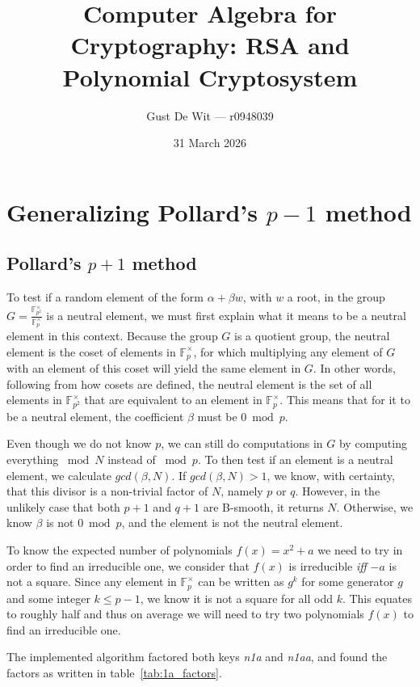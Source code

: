 \documentclass{article}
\title{Computer Algebra for Cryptography: RSA and Polynomial Cryptosystem}
\author{Gust De Wit --- r0948039 }
\date{31 March 2026}
\begin{document}
\maketitle

\section{Generalizing Pollard's $p-1$ method}
\subsection{Pollard's $p+1$ method}
To test if a random element of the form $\alpha + \beta w$, with $w$ a root, in the group $G = \frac{\mathbb{F}_{p^2}^\times}{\mathbb{F}_p^\times}$ is a neutral element, we must first explain what it means to be a neutral element in this context. Because the group $G$ is a quotient group, the neutral element is the coset of elements in $\mathbb{F}_{p}^\times$, for which multiplying any element of $G$ with an element of this coset will yield the same element in $G$. In other words, following from how cosets are defined, the neutral element is the set of all elements in $\mathbb{F}_{p^2}^\times$ that are equivalent to an element in $\mathbb{F}_p^\times$. This means that for it to be a neutral element, the coefficient $\beta$ must be $0 \bmod p$.

Even though we do not know $p$, we can still do computations in $G$ by computing everything $\bmod N$ instead of $\bmod p$. To then test if an element is a neutral element, we calculate $gcd(\beta, N)$. If $gcd(\beta, N) > 1$, we know, with certainty, that this divisor is a non-trivial factor of $N$, namely $p$ or $q$. However, in the unlikely case that both $p+1$ and $q+1$ are B-smooth, it returns $N$. Otherwise, we know $\beta$ is not $0 \bmod p$, and the element is not the neutral element.

To know the expected number of polynomials $f(x) = x^2 + a$ we need to try in order to find an irreducible one, we consider that $f(x)$ is irreducible \textit{iff} $-a$ is not a square. Since any element in $\mathbb{F}_p^\times$ can be written as $g^k$ for some generator $g$ and some integer $k \le p - 1$, we know it is not a square for all odd $k$. This equates to roughly half and thus on average we will need to try two polynomials $f(x)$ to find an irreducible one.

The implemented algorithm factored both keys \textit{n1a} and \textit{n1aa}, and found the factors as written in table~\ref{tab:1a_factors}.
\end{document}
